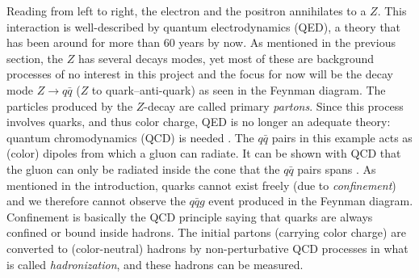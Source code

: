 \documentclass[a4paper, twoside, nobib]{tufte-book}
\newcommand{\autocite}[1]{\citep{#1}}
\begin{document}
Reading from left to right, the electron and the positron annihilates to a $Z$. This interaction is well-described by quantum electrodynamics (QED), a theory that has been around for more than 60 years by now. As mentioned in the previous section, the $Z$ has several decays modes, yet most of these are background processes of no interest in this project and the focus for now will be the decay mode $Z \rightarrow q\bar{q}$ ($Z$ to quark--anti-quark) as seen in the Feynman diagram. The particles produced by the $Z$-decay are called primary \emph{partons}. Since this process involves quarks, and thus color charge, QED is no longer an adequate theory: quantum chromodynamics (QCD) is needed \autocite{Armstrong1998hy}. The $q\bar{q}$ pairs in this example acts as (color) dipoles from which a gluon can radiate. It can be shown with QCD that the gluon can only be radiated inside the cone that the $q\bar{q}$ pairs spans \autocite{bierlichRopeHadronizationGeometry2016}. As mentioned in the introduction, quarks cannot exist freely (due to \emph{confinement}) and we therefore cannot observe the $q\bar{q}g$ event produced in the Feynman diagram. Confinement is basically the QCD principle saying that quarks are always confined or bound inside hadrons. The initial partons (carrying color charge) are converted to (color-neutral) hadrons by non-perturbative QCD processes in what is called \emph{hadronization}, and these hadrons can be measured. 
\end{document}

